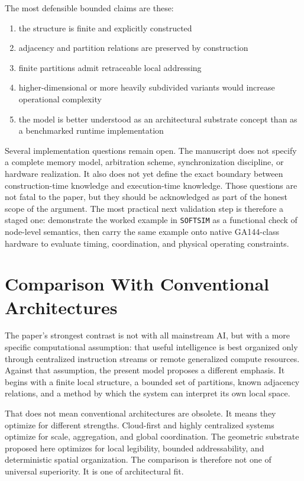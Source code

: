 \documentclass[11pt]{article}
\begin{document}
The most defensible bounded claims are these:

\begin{enumerate}
\item the structure is finite and explicitly constructed
\item adjacency and partition relations are preserved by construction
\item finite partitions admit retraceable local addressing
\item higher-dimensional or more heavily subdivided variants would increase
operational complexity
\item the model is better understood as an architectural substrate concept than
as a benchmarked runtime implementation
\end{enumerate}

Several implementation questions remain open. The manuscript does not specify a
complete memory model, arbitration scheme, synchronization discipline, or
hardware realization. It also does not yet define the exact boundary between
construction-time knowledge and execution-time knowledge. Those questions are
not fatal to the paper, but they should be acknowledged as part of the honest
scope of the argument. The most practical next validation step is therefore a
staged one: demonstrate the worked example in \texttt{SOFTSIM} as a functional
check of node-level semantics, then carry the same example onto native
GA144-class hardware to evaluate timing, coordination, and physical operating
constraints.

\section{Comparison With Conventional Architectures}

The paper's strongest contrast is not with all mainstream AI, but with a more
specific computational assumption: that useful intelligence is best organized
only through centralized instruction streams or remote generalized compute
resources. Against that assumption, the present model proposes a different
emphasis. It begins with a finite local structure, a bounded set of partitions,
known adjacency relations, and a method by which the system can interpret its
own local space.

That does not mean conventional architectures are obsolete. It means they
optimize for different strengths. Cloud-first and highly centralized systems
optimize for scale, aggregation, and global coordination. The geometric
substrate proposed here optimizes for local legibility, bounded addressability,
and deterministic spatial organization. The comparison is therefore not one of
universal superiority. It is one of architectural fit.
\end{document}
